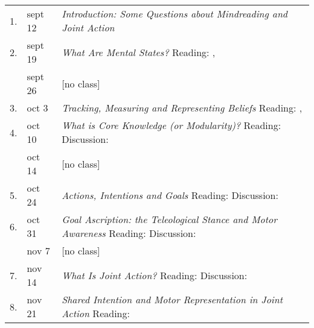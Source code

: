 \documentclass[12pt,\papersize]{extarticle}
\begin{document}
{\begin{table}[htbp]
\begin{center}
\begin{tabular*}{1\textwidth}{ l l m{} }
1. & sept 12  
	&  \textit{Introduction: Some Questions about Mindreading and Joint Action}
\\  2. & sept 19  
	& \textit{What Are Mental States?}
		\newline Reading: \citet[§§1.1--1.3, 3.1--3.4, 4.1]{Jeffrey:1983oe}, \citet[§1]{fitch:2009_singular}
\\ &   sept 26 & [no class]
\\ 3. & oct 3 
		& \textit{Tracking, Measuring and Representing Beliefs}
			\newline  Reading: \citet{matthews:1994_measure}, \citet{kovacs_social_2010}
\\  4. & oct 10 
	&  \textit{What is Core Knowledge (or Modularity)?}
		\newline Reading: \citet{Fodor:1983dg,Fodor:2000cj,Baillargeon:gx,Wellman:2001lz}
		\newline Discussion: {\citet{Sugden:2000mw}}
\\ & oct 14 & [no class]
\\ 5. & oct 24 
	& 	%
		\textit{Actions, Intentions and Goals}
		\newline Reading: \citet{Davidson:1971fz,Davidson:1978hy,Bratman:1985fk,bratman:2000_valuing} 
		\newline Discussion:  \sout{\citet{matthews:1994_measure}} \citep{shah:2005_doxastic}
\\ 6. & oct 31 
	& \textit{Goal Ascription: the Teleological Stance and Motor Awareness}
		\newline Reading: \citet{Millikan:1989cd,Millikan:1993_behaviour,Millikan:1993_green,Gergely:1995sq,Csibra:2003kp,Fogassi:2005nf}
		\newline Discussion: \citet{Davidson:1973jx}
\\ & nov 7 & [no class]
\\ 7. & nov 14 
	& \textit{What Is Joint Action?}
		\newline Reading: \citet{Bratman:1992mi,Bratman:1993je,ludwig_collective_2007,Searle:1990em,carpenter:2009_howjoint}
		\newline Discussion: \citet{Bratman:1984jr}
\\ 8. & nov 21 
	&  \textit{Shared Intention and Motor Representation in Joint Action}
		\newline Reading: \citet{Knoblich:2008hy,kourtis:2010_favoritism}

\end{tabular*}
\end{center}
\end{table}}
\end{document}
